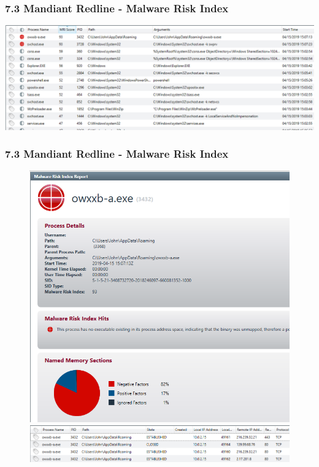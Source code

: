 \begin{frame}
  \frametitle{7.3 Mandiant Redline - Malware Risk Index}
  \includegraphics[scale=0.38]{images/f12_redline-1.png}
\end{frame}

\begin{frame}
  \frametitle{7.3 Mandiant Redline - Malware Risk Index}
  \begin{figure}
    \begin{center}
      \includegraphics[scale=0.28]{images/f12_redline-2.png}

      \vspace{0.2cm}

      \includegraphics[scale=0.35]{images/f12_redline-3.png}
    \end{center}
  \end{figure}
\end{frame}


